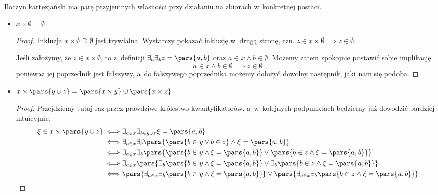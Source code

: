 Iloczyn kartezjański ma parę przyjemnych własności przy działaniu na zbiorach w~konkretnej postaci.
\begin{itemize}
	\item \(x \times \emptyset = \emptyset\)
	      \begin{proof}
		      Inkluzja \(x \times \emptyset \supseteq \emptyset\) jest trywialna. Wystarczy pokazać inkluzję w~drugą stronę, tzn. \(z \in x \times \emptyset \implies z \in \emptyset\).

		      Jeśli założymy, że \(z \in x \times \emptyset\), to z~definicji \(\exists_a\exists_b z = \pars{a, b}\) oraz \(a \in x \land b \in \emptyset\). Możemy zatem spokojnie postawić sobie implikację
		      \begin{equation*}
			      a \in x \land b \in \emptyset \implies z \in \emptyset
		      \end{equation*}
		      ponieważ jej poprzednik jest fałszywy, a~do fałszywego poprzednika możemy dołożyć dowolny następnik, jaki nam się podoba.
	      \end{proof}
	\item \(x \times \pars{y \cup z} = \pars{x \times y} \cup \pars{x \times z}\)
	      \begin{proof}
		      Przejdziemy tutaj raz przez prawdziwe królestwo kwantyfikatorów, a~w~kolejnych podpunktach będziemy już dowodzić bardziej intuicyjnie.
		      \begin{equation*}
			      \begin{split}
				      \xi \in x \times \pars{y \cup z}
				      \iff & \exists_{a \in x}\exists_{b \in y \cup z} \xi = \pars{a, b}                                                                                          \\
				      \iff & \exists_{a \in x}\exists_b\pars{\pars{b \in y \lor b \in z} \land \xi = \pars{a, b}}                                                                 \\
				      \iff & \exists_{a \in x}\exists_b\pars{\pars{b \in y \land \xi = \pars{a, b}} \lor \pars{b \in z \land \xi = \pars{a, b}}}                                  \\
				      \iff & \exists_{a \in x}\pars{\exists_b\pars{b \in y \land \xi = \pars{a, b}} \lor \exists_b\pars{b \in z \land \xi = \pars{a, b}}}                         \\
				      \iff & \pars{\exists_{a \in x}\exists_b\pars{b \in y \land \xi = \pars{a, b}}} \lor \pars{\exists_{a \in x}\exists_b\pars{b \in z \land \xi = \pars{a, b}}} \\

\end{split}
\end{equation*}
\end{proof}
\end{itemize}
